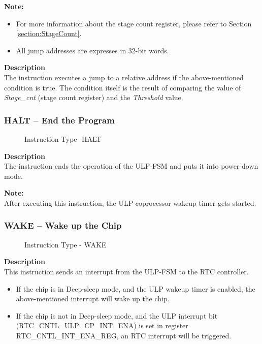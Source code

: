 \documentclass[main\_\_EN.tex]{subfiles}
\begin{document}
\textbf{Note:}
\begin{itemize}
    \item For more information about the stage count register, please refer to Section \ref{section:StageCount}.
    \item All jump addresses are expresses in 32-bit words.
\end{itemize}

\textbf{Description} \\
The instruction executes a jump to a relative address if the above-mentioned condition is true. The condition itself is the result of comparing the value of \textit{Stage\_cnt} (stage count register) and the \textit{Threshold} value.


\subsubsection{HALT – End the Program} \label{subsection:HALT}

%
%
\begin{figure}[!ht ]
    \centering
    \caption{Instruction Type- HALT}
    \label{figure:HALT}
\end{figure}

\textbf{ Description } \\
The instruction ends the operation of the ULP-FSM and puts it into power-down mode.


\textbf{Note:} \\
After executing this instruction, the ULP coprocessor wakeup timer gets started.


\subsubsection{WAKE – Wake up the Chip}

%
%
%
%
\begin{figure}[!ht ]
    \centering
    \caption{Instruction Type - WAKE}
    \label{figure:WAKE}
\end{figure}

\textbf{ Description } \\
This instruction sends an interrupt from the ULP-FSM to the RTC controller.

\begin{itemize}
    \item If the chip is in Deep-sleep mode, and the ULP wakeup timer is enabled, the above-mentioned interrupt will wake up the chip.
    \item If the chip is not in Deep-sleep mode, and the ULP interrupt bit (RTC\_CNTL\_ULP\_CP\_INT\_ENA) is set in register RTC\_CNTL\_INT\_ENA\_REG, an RTC interrupt will be triggered.
\end{itemize}
\end{document}
